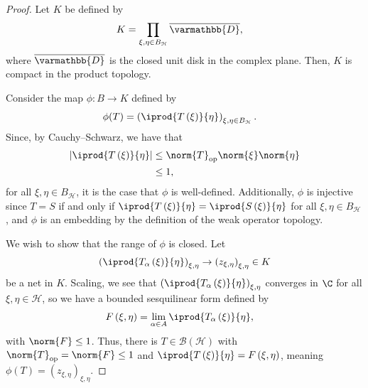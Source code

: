 \documentclass[10pt]{mypackage}
\renewcommand*{\mathbb}[1]{\varmathbb{#1}}
\begin{document}
\begin{proof}
  Let $K$ be defined by
  \begin{align*}
    K &= \prod_{\xi,\eta\in B_{\mathcal{H}}}\overline{\mathbb{D}},
  \end{align*}
  where $\overline{\mathbb{D}}$ is the closed unit disk in the complex plane. Then, $K$ is compact in the product topology.\newline

  Consider the map $\phi\colon B\rightarrow K$ defined by
  \begin{align*}
    \phi(T) &= \left( \iprod{T\left(\xi\right)}{\eta}\right)_{\xi,\eta\in B_{\mathcal{H}}}.
  \end{align*}
  Since, by Cauchy--Schwarz, we have that
  \begin{align*}
    \left\vert \iprod{T\left(\xi\right)}{\eta} \right\vert &\leq \norm{T}_{\text{op}}\norm{\xi}\norm{\eta}\\
                                                           &\leq 1,
  \end{align*}
  for all $\xi,\eta\in B_{\mathcal{H}}$, it is the case that $\phi$ is well-defined. Additionally, $\phi$ is injective since $T = S$ if and only if $ \iprod{T\left(\xi\right)}{\eta} = \iprod{S\left(\xi\right)}{\eta} $ for all $\xi,\eta\in B_{\mathcal{H}}$, and $\phi$ is an embedding by the definition of the weak operator topology.\newline

  We wish to show that the range of $\phi$ is closed. Let
  \begin{align*}
    \left( \iprod{T_{\alpha}\left(\xi\right)}{\eta}\right)_{\xi,\eta} \rightarrow \left(z_{\xi,\eta}\right)_{\xi,\eta}\in K
  \end{align*}
  be a net in $K$. Scaling, we see that $\left( \iprod{T_{\alpha}\left(\xi\right)}{\eta}\right)_{\xi,\eta}$ converges in $\C$ for all $\xi,\eta\in \mathcal{H}$, so we have a bounded sesquilinear form defined by
  \begin{align*}
    F\left(\xi,\eta\right) &= \lim_{\alpha \in A} \iprod{T_{\alpha}\left(\xi\right)}{\eta},
  \end{align*}
  with $\norm{F} \leq 1$. Thus, there is $T\in \mathcal{B}\left(\mathcal{H}\right)$ with $\norm{T}_{\text{op}} = \norm{F} \leq 1$ and $ \iprod{T\left(\xi\right)}{\eta} = F\left(\xi,\eta\right) $, meaning $\phi(T) = \left(z_{\xi,\eta}\right)_{\xi,\eta}$.
\end{proof}
\end{document}
